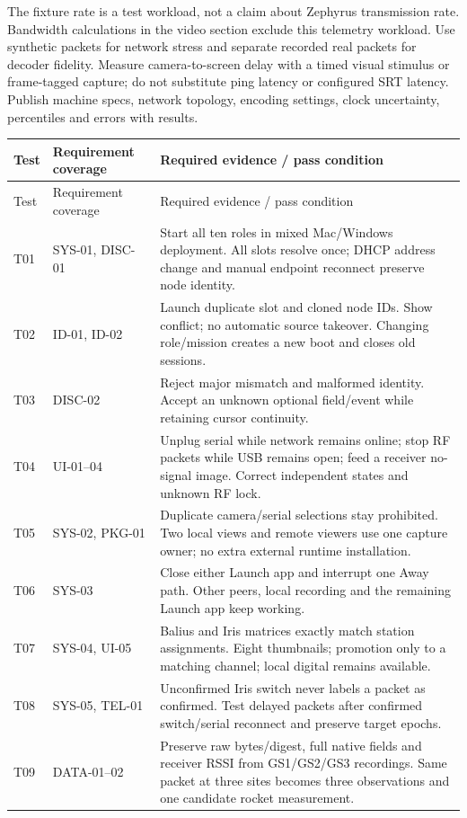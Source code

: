 The fixture rate is a test workload, not a claim about Zephyrus transmission rate.
Bandwidth calculations in the video section exclude this telemetry workload.
Use synthetic packets for network stress and separate recorded real packets for
decoder fidelity. Measure camera-to-screen delay with a timed visual stimulus
or frame-tagged capture; do not substitute ping latency or configured SRT latency.
Publish machine specs, network topology, encoding settings, clock uncertainty,
percentiles and errors with results.

\begin{longtable}{L{16mm}L{35mm}L{110mm}}
\toprule Test & Requirement coverage & Required evidence / pass condition\\\midrule
\endfirsthead
\toprule Test & Requirement coverage & Required evidence / pass condition\\\midrule
\endhead
T01 & SYS-01, DISC-01 & Start all ten roles in mixed Mac/Windows deployment. All slots resolve once; DHCP address change and manual endpoint reconnect preserve node identity.\\
T02 & ID-01, ID-02 & Launch duplicate slot and cloned node IDs. Show conflict; no automatic source takeover. Changing role/mission creates a new boot and closes old sessions.\\
T03 & DISC-02 & Reject major mismatch and malformed identity. Accept an unknown optional field/event while retaining cursor continuity.\\
T04 & UI-01--04 & Unplug serial while network remains online; stop RF packets while USB remains open; feed a receiver no-signal image. Correct independent states and unknown RF lock.\\
T05 & SYS-02, PKG-01 & Duplicate camera/serial selections stay prohibited. Two local views and remote viewers use one capture owner; no extra external runtime installation.\\
T06 & SYS-03 & Close either Launch app and interrupt one Away path. Other peers, local recording and the remaining Launch app keep working.\\
T07 & SYS-04, UI-05 & Balius and Iris matrices exactly match station assignments. Eight thumbnails; promotion only to a matching channel; local digital remains available.\\
T08 & SYS-05, TEL-01 & Unconfirmed Iris switch never labels a packet as confirmed. Test delayed packets after confirmed switch/serial reconnect and preserve target epochs.\\
T09 & DATA-01--02 & Preserve raw bytes/digest, full native fields and receiver RSSI from GS1/GS2/GS3 recordings. Same packet at three sites becomes three observations and one candidate rocket measurement.\\

\end{longtable}

